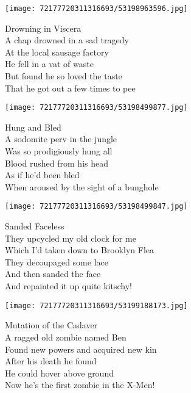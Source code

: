 \documentclass[10pt,letterpaper]{article}
\begin{document}
\begin{center}\texttt{[image: 72177720311316693/53198963596.jpg]}
\end{center}
\begin{center}
Drowning in Viscera\\
\vskip 0.2in
A chap drowned in a sad tragedy\\
At the local sausage factory\\
He fell in a vat of waste\\
But found he so loved the taste\\
That he got out a few times to pee\\
\end{center}
\pagebreak

\begin{center}
\texttt{[image: 72177720311316693/53198499877.jpg]}
\end{center}

\begin{center}
Hung and Bled\\
\vskip 0.2in
A sodomite perv in the jungle\\
Was so prodigiously hung all\\
Blood rushed from his head\\
As if he'd been bled\\
When aroused by the sight of a bunghole\\
\end{center}
\pagebreak

\begin{center}
\texttt{[image: 72177720311316693/53198499847.jpg]}
\end{center}

\begin{center}
Sanded Faceless\\
\vskip 0.2in
They upcycled my old clock for me\\
Which I'd taken down to Brooklyn Flea\\
They decoupaged some lace\\
And then sanded the face\\
And repainted it up quite kitschy!\\
\end{center}
\pagebreak

\begin{center}\texttt{[image: 72177720311316693/53199188173.jpg]}
\end{center}
\begin{center}
Mutation of the Cadaver\\
\vskip 0.2in
A ragged old zombie named Ben\\
Found new powers and acquired new kin\\
After his death he found\\
He could hover above ground\\
Now he's the first zombie in the X-Men!\\
\end{center}
\pagebreak
\end{document}
